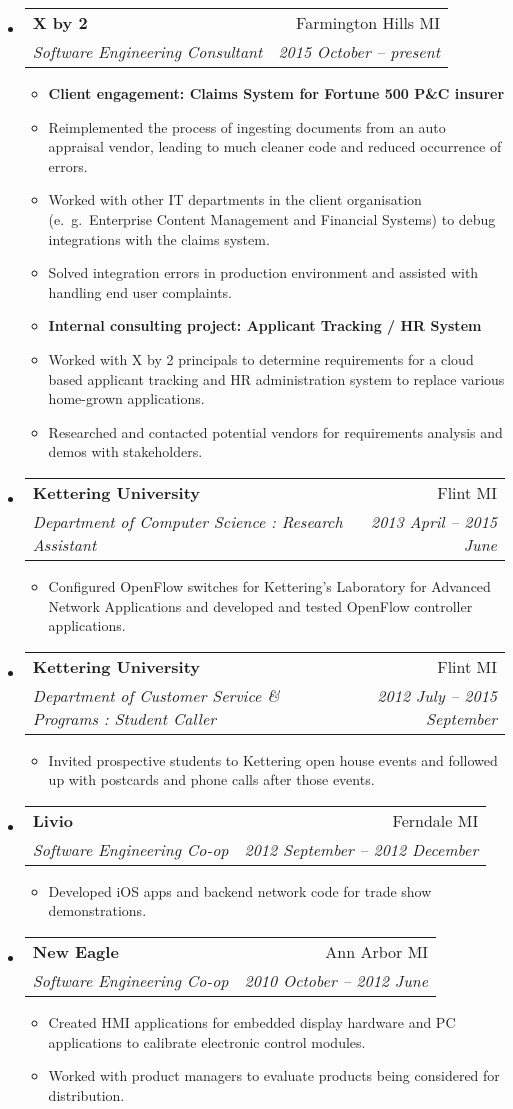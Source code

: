 \documentclass[letterpaper,10pt]{article}
\makeatletter
\newcommand{\resitem}[1]{\item #1 \vspace{-2pt}}
\newcommand{\ressubheading}[4]{
\begin{tabular*}{6.5in}{l@{\cftdotfill{\cftsecdotsep}\extracolsep{\fill}}r}
		\textbf{#1} & #2 \\
		\textit{#3} & \textit{#4} \\
\end{tabular*}\vspace{-6pt}}
\makeatother
\begin{document}
\begin{itemize}

\item
	\ressubheading{X by 2}{Farmington Hills MI}{Software Engineering Consultant}{2015 October -- present}
	\begin{itemize}
      \resitem{{\bf Client engagement: Claims System for Fortune 500 P\&C insurer}}
      \resitem{Reimplemented the process of ingesting documents from an auto appraisal vendor,
      	       leading to much cleaner code and reduced occurrence of errors.}
      \resitem{Worked with other IT departments in the client organisation (e.\ g.\ Enterprise Content Management 
      	       and Financial Systems) to debug integrations with the claims system.}
      \resitem{Solved integration errors in production environment and assisted with handling end user complaints.}
      \resitem{{\bf Internal consulting project: Applicant Tracking / HR System}}
      \resitem{Worked with X by 2 principals to determine requirements for a cloud based applicant tracking
      	       and HR administration system to replace various home-grown applications.}
      \resitem{Researched and contacted potential vendors for requirements analysis and demos with stakeholders.}
	\end{itemize}

\item
	\ressubheading{Kettering University}{Flint MI}{Department of Computer Science : Research Assistant}{2013 April -- 2015 June}
	\begin{itemize}
       \resitem{Configured OpenFlow switches for Kettering's Laboratory for Advanced Network Applications
       	        and developed and tested OpenFlow controller applications.}
	\end{itemize}
	
\item
\ressubheading{Kettering University}{Flint MI}{Department of Customer Service \& Programs : Student Caller}{2012 July -- 2015 September}
\begin{itemize}
	\resitem{Invited prospective students to Kettering open house events and followed up with postcards 
		     and phone calls after those events.}
\end{itemize}

\item
	\ressubheading{Livio}{Ferndale MI}{Software Engineering Co-op}{2012 September -- 2012 December}
	\begin{itemize}
    \resitem{Developed iOS apps and backend network code for trade show demonstrations.}
	\end{itemize}

\item
    \ressubheading{New Eagle}{Ann Arbor MI}{Software Engineering Co-op}{2010 October -- 2012 June}
    \begin{itemize}
    \resitem{Created HMI applications for embedded display hardware and PC applications to calibrate electronic control modules.}
    \resitem{Worked with product managers to evaluate products being considered for distribution.}
    \end{itemize}

\end{itemize}
\end{document}
